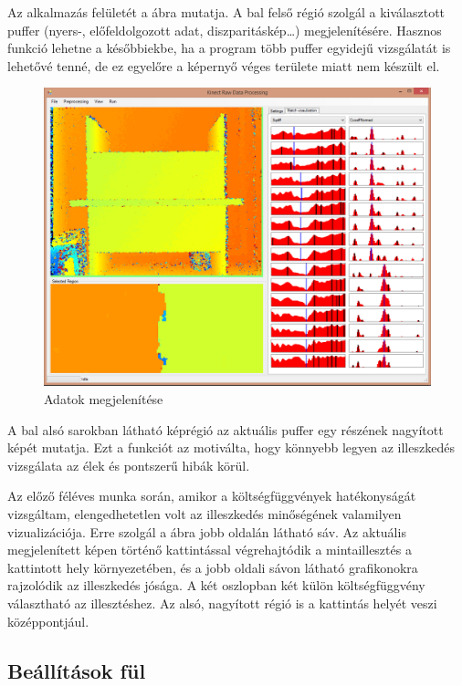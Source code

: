 Az alkalmazás felületét a  ábra mutatja.
A bal felső régió szolgál a kiválasztott puffer (nyers-, előfeldolgozott adat, diszparitáskép\dots) megjelenítésére.
Hasznos funkció lehetne a későbbiekbe, ha a program több puffer egyidejű vizsgálatát is lehetővé tenné, de ez egyelőre a képernyő véges területe miatt nem készült el.

\begin{figure}[ht!]
	\centering
	\includegraphics[width=0.9\linewidth]{figures/gui_data.png}
	\caption{Adatok megjelenítése}
	\label{fig:guiData}
\end{figure}

A bal alsó sarokban látható képrégió az aktuális puffer egy részének nagyított képét mutatja.
Ezt a funkciót az motiválta, hogy könnyebb legyen az illeszkedés vizsgálata az élek és pontszerű hibák körül.

Az előző féléves munka során, amikor a költségfüggvények hatékonyságát vizsgáltam, elengedhetetlen volt az illeszkedés minőségének valamilyen vizualizációja.
Erre szolgál a  ábra jobb oldalán látható sáv.
Az aktuális megjelenített képen történő kattintással végrehajtódik a mintaillesztés a kattintott hely környezetében, és a jobb oldali sávon látható grafikonokra rajzolódik az illeszkedés jósága.
A két oszlopban két külön költségfüggvény választható az illesztéshez.
Az alsó, nagyított régió is a kattintás helyét veszi középpontjául.

\subsection{Beállítások fül}\label{sect:settingsView}

